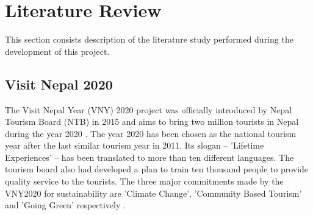 \documentclass[12pt, a4paper, oneside]{article}
\begin{document}
%
%













\break
\section{Literature Review}
This section consists description of the literature study performed during the development of this project.

\subsection{Visit Nepal 2020}
The Visit Nepal Year (VNY) 2020 project was officially introduced by Nepal Tourism Board (NTB) in 2015 and aims to bring two million tourists in Nepal during the year 2020 \cite{visitnepal}. The year 2020 has been chosen as the national tourism year after the last similar tourism year in 2011. Its slogan -- 'Lifetime Experiences' --  has been translated to more than ten different languages. The tourism board also had developed a plan to train ten thousand people to provide quality service to the tourists. The three major commitments made by the VNY2020 for sustainability are 'Climate Change', 'Community Based Tourism' and 'Going Green' respectively \cite{vny}.
\end{document}
